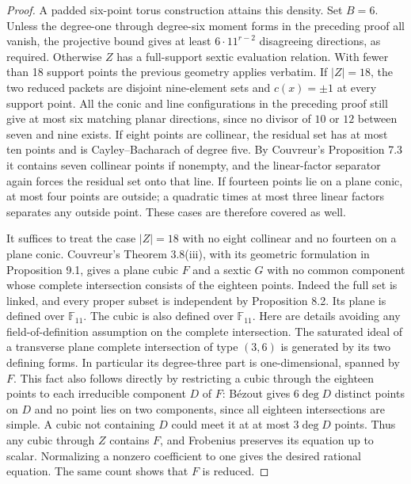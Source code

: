 \documentclass[11pt]{article}
\begin{document}
\begin{proof}
A padded six-point torus construction attains this density. Set $B=6$. Unless the degree-one through degree-six moment forms in the preceding proof all vanish, the projective bound gives at least $6\cdot11^{r-2}$ disagreeing directions, as required. Otherwise $Z$ has a full-support sextic evaluation relation. With fewer than 18 support points the previous geometry applies verbatim. If $|Z|=18$, the two reduced packets are disjoint nine-element sets and $c(x)=\pm1$ at every support point. All the conic and line configurations in the preceding proof still give at most six matching planar directions, since no divisor of $10$ or $12$ between seven and nine exists. If eight points are collinear, the residual set has at most ten points and is Cayley--Bacharach of degree five. By Couvreur's Proposition 7.3 it contains seven collinear points if nonempty, and the linear-factor separator again forces the residual set onto that line. If fourteen points lie on a plane conic, at most four points are outside; a quadratic times at most three linear factors separates any outside point. These cases are therefore covered as well.

It suffices to treat the case $|Z|=18$ with no eight collinear and no fourteen on a plane conic. Couvreur's Theorem 3.8(iii), with its geometric formulation in Proposition 9.1, gives a plane cubic $F$ and a sextic $G$ with no common component whose complete intersection consists of the eighteen points. Indeed the full set is linked, and every proper subset is independent by Proposition 8.2. Its plane is defined over $\mathbb F_{11}$. The cubic is also defined over $\mathbb F_{11}$. Here are details avoiding any field-of-definition assumption on the complete intersection. The saturated ideal of a transverse plane complete intersection of type $(3,6)$ is generated by its two defining forms. In particular its degree-three part is one-dimensional, spanned by $F$. This fact also follows directly by restricting a cubic through the eighteen points to each irreducible component $D$ of $F$: B\'ezout gives $6\deg D$ distinct points on $D$ and no point lies on two components, since all eighteen intersections are simple. A cubic not containing $D$ could meet it at at most $3\deg D$ points. Thus any cubic through $Z$ contains $F$, and Frobenius preserves its equation up to scalar. Normalizing a nonzero coefficient to one gives the desired rational equation. The same count shows that $F$ is reduced.


\end{proof}
\end{document}
